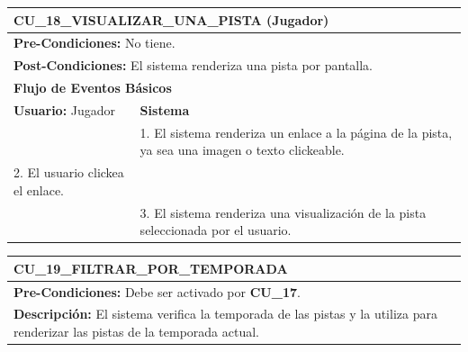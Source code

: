 \begin{center}
  \begin{tabular}{| p{7.5cm} | p{7.5cm} |}
    \hline
    \multicolumn{2}{|p{15cm}|}{\textbf{CU\_18\_VISUALIZAR\_UNA\_PISTA} (Jugador)} \\ \hline
    \multicolumn{2}{|p{15cm}|}{\textbf{Pre-Condiciones:} No tiene.} \\ \hline
    \multicolumn{2}{|p{15cm}|}{\textbf{Post-Condiciones:} El sistema renderiza una pista por pantalla.} \\ \hline
    \multicolumn{2}{|p{7.5cm}|}{\textbf{Flujo de Eventos Básicos}} \\ \hline
    \multicolumn{1}{|p{7.5cm}|}{\textbf{Usuario:} Jugador} & \multicolumn{1}{|p{7.5cm}|}{\textbf{Sistema}} \\ \hline
    
    \multicolumn{1}{|p{7.5cm}|}{} & 
    \multicolumn{1}{|p{7.5cm}|}{1. El sistema renderiza un enlace a la página de la pista, ya sea una imagen o texto clickeable.}\\ \hline
    
    \multicolumn{1}{|p{7.5cm}|}{2. El usuario clickea el enlace.} & 
    \multicolumn{1}{|p{7.5cm}|}{}\\ \hline
    
    \multicolumn{1}{|p{7.5cm}|}{} & 
    \multicolumn{1}{|p{7.5cm}|}{3. El sistema renderiza una visualización de la pista seleccionada por el usuario.}\\ \hline
  \end{tabular}
  
  \label{table:usecase:18}
\end{center}

\begin{center}
  \begin{tabular}{| p{7.5cm} | p{7.5cm} |}
    \hline
    \multicolumn{2}{|p{15cm}|}{\textbf{CU\_19\_FILTRAR\_POR\_TEMPORADA}} \\ \hline
    \multicolumn{2}{|p{15cm}|}{\textbf{Pre-Condiciones:} Debe ser activado por \textbf{CU\_17}.} \\ \hline
    \multicolumn{2}{|p{15cm}|}{\textbf{Descripción:} El sistema verifica la temporada de las pistas y la utiliza para renderizar las pistas de la temporada actual.} \\
    \hline
  \end{tabular}
  
  \label{table:usecase:19}
\end{center}

